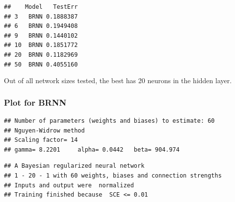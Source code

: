 \begin{Shaded}
\begin{Highlighting}[]
\OtherTok{\textless{}{-}} \NormalTok{(}\NormalTok{(} \NormalTok{, }
\end{Highlighting}
\end{Shaded}

\begin{verbatim}
##    Model   TestErr
## 3   BRNN 0.1888387
## 6   BRNN 0.1949408
## 9   BRNN 0.1440102
## 10  BRNN 0.1851772
## 20  BRNN 0.1182969
## 50  BRNN 0.4055160
\end{verbatim}

Out of all network sizes tested, the best has 20 neurons in the hidden
layer.

\hypertarget{plot-for-brnn}{%
\subsubsection{Plot for BRNN}\label{plot-for-brnn}}

\begin{Shaded}
\begin{Highlighting}[]
\OtherTok{\textless{}{-}} \SpecialCharTok{\textasciitilde{}}\NormalTok{)   }
\end{Highlighting}
\end{Shaded}

\begin{verbatim}
## Number of parameters (weights and biases) to estimate: 60 
## Nguyen-Widrow method
## Scaling factor= 14 
## gamma= 8.2201     alpha= 0.0442   beta= 904.974
\end{verbatim}

\begin{Shaded}
\begin{Highlighting}[]
\end{Highlighting}
\end{Shaded}

\begin{verbatim}
## A Bayesian regularized neural network 
## 1 - 20 - 1 with 60 weights, biases and connection strengths
## Inputs and output were  normalized
## Training finished because  SCE <= 0.01
\end{verbatim}

